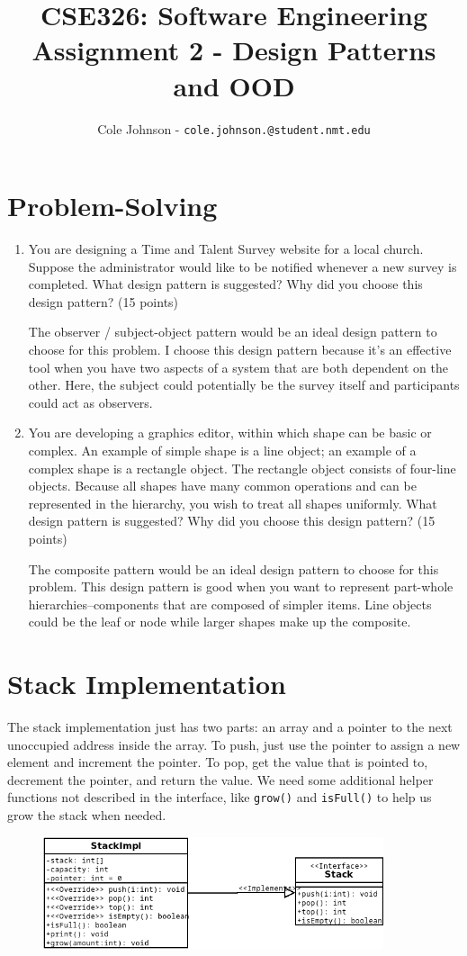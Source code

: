 \documentclass[english,12pt]{article}
\author{
    Cole Johnson - \texttt{cole.johnson.@student.nmt.edu}
}
\title{
    \textbf{CSE326: Software Engineering} \\
    \LARGE{Assignment 2 - Design Patterns and OOD}
}
\begin{document}
 \maketitle
 \section*{Problem-Solving}
 \frenchspacing
 \begin{enumerate}[\bf (1.)]
  \item You are designing a Time and Talent Survey website for a local church. 
  Suppose the administrator would like to be notified whenever a new survey is completed.
  What design pattern is suggested? Why did you choose 
  this design pattern? (15 points)

  The observer / subject-object pattern would be an ideal design pattern to choose for this problem.
  I choose this design pattern because it's an effective tool when you have two aspects of a
  system that are both dependent on the other. Here, the subject could potentially be the survey 
  itself and participants could act as observers. 

  \item You are developing a graphics editor, within which shape can be basic or complex. 
  An example of simple shape is a line object; an example of a complex shape 
  is a rectangle object. The rectangle object consists of four-line objects. 
  Because all shapes have many common operations and can be represented in the 
  hierarchy, you wish to treat all shapes uniformly.
  What design pattern is suggested? Why did you choose this design pattern? 
  (15 points)

 The composite pattern would be an ideal design pattern to choose for this problem.
 This design pattern is good when you want to represent part-whole hierarchies--components
 that are composed of simpler items. Line objects could be the leaf or node while
 larger shapes make up the composite.
 \end{enumerate}
\pagebreak
\section*{Stack Implementation}
The stack implementation just has two parts: an array and a pointer to the next
unoccupied address inside the array. To push, just use the pointer to assign a new
element and increment the pointer. To pop, get the value that is pointed to,
decrement the pointer, and return the value. We need some additional helper functions
not described in the interface, like \texttt{grow()} and \texttt{isFull()} to help 
us grow the stack when needed.
\begin{figure}[H]
   \includegraphics[width=10cm]{diagrams/StackImp.png}
\end{figure}
\end{document}
